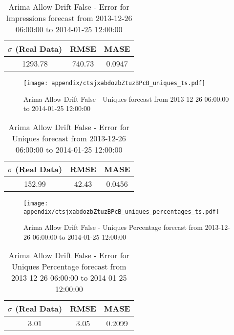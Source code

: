 \begin{table}[H]
\centering
\footnotesize
\begin{tabular}{ccc}
$\sigma$ (Real Data) & RMSE & MASE   \\ \hline
1293.78 & 740.73 & 0.0947 \\
\end{tabular}

\vspace{0.5cm}

\caption{
Arima Allow Drift False - Error for Impressions forecast from 2013-12-26 06:00:00 to 2014-01-25 12:00:00}
\end{table}

\begin{figure}[H] \begin{center} \leavevmode
\texttt{[image: appendix/ctsjxabdozbZtuzBPcB\_uniques\_ts.pdf]} \caption{
Arima Allow Drift False - Uniques forecast from 2013-12-26 06:00:00 to 2014-01-25 12:00:00} \label{fig:appendix/ctsjxabdozbZtuzBPcB_uniques_ts.pdf} \end{center}
\end{figure}

\begin{table}[H]
\centering
\footnotesize
\begin{tabular}{ccc}
$\sigma$ (Real Data) & RMSE & MASE   \\ \hline
152.99 & 42.43 & 0.0456 \\
\end{tabular}

\vspace{0.5cm}

\caption{
Arima Allow Drift False - Error for Uniques forecast from 2013-12-26 06:00:00 to 2014-01-25 12:00:00}
\end{table}

\begin{figure}[H] \begin{center} \leavevmode
\texttt{[image: appendix/ctsjxabdozbZtuzBPcB\_uniques\_percentages\_ts.pdf]} \caption{
Arima Allow Drift False - Uniques Percentage forecast from 2013-12-26 06:00:00 to 2014-01-25 12:00:00} \label{fig:appendix/ctsjxabdozbZtuzBPcB_uniques_percentages_ts.pdf} \end{center}
\end{figure}

\begin{table}[H]
\centering
\footnotesize
\begin{tabular}{ccc}
$\sigma$ (Real Data) & RMSE & MASE   \\ \hline
3.01 & 3.05 & 0.2099 \\
\end{tabular}

\vspace{0.5cm}

\caption{
Arima Allow Drift False - Error for Uniques Percentage forecast from 2013-12-26 06:00:00 to 2014-01-25 12:00:00}
\end{table}


